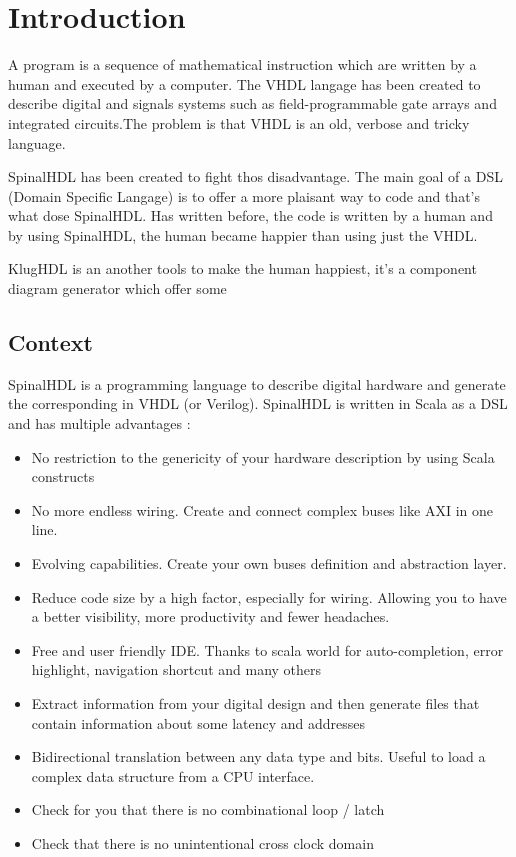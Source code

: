 \chapter{Introduction} %
\label{cha:Introduction}

A program is a sequence of mathematical instruction which are written by a human and executed by a computer.
The VHDL langage has been created to describe digital and signals systems such as field-programmable gate arrays
and integrated circuits\cite{wiki-vhdl}.The problem is that VHDL is an old, verbose and tricky language.

SpinalHDL has been created to fight thos disadvantage. The main goal of a DSL (Domain Specific Langage) is to offer a more plaisant way to code and that's what dose SpinalHDL. Has written before, the code is written by a human and by using SpinalHDL, the human became happier than using just the VHDL.

KlugHDL is an another tools to make the human happiest, it's a component diagram generator which offer some

\section{Context} %
\label{sec:Context}

SpinalHDL is a programming language to describe digital hardware and generate the corresponding in VHDL (or Verilog). SpinalHDL is written in Scala as a DSL and has multiple advantages\cite{github-spinalhdl} :
\begin{itemize}
    \item No restriction to the genericity of your hardware description by using Scala constructs
    \item No more endless wiring. Create and connect complex buses like AXI in one line.
    \item Evolving capabilities. Create your own buses definition and abstraction layer.
    \item Reduce code size by a high factor, especially for wiring. Allowing you to have a better visibility, more productivity and fewer headaches.
    \item Free and user friendly IDE. Thanks to scala world for auto-completion, error highlight, navigation shortcut and many others
    \item Extract information from your digital design and then generate files that contain information about some latency and addresses
    \item Bidirectional translation between any data type and bits. Useful to load a complex data structure from a CPU interface.
    \item Check for you that there is no combinational loop / latch
    \item Check that there is no unintentional cross clock domain 
\end{itemize}

